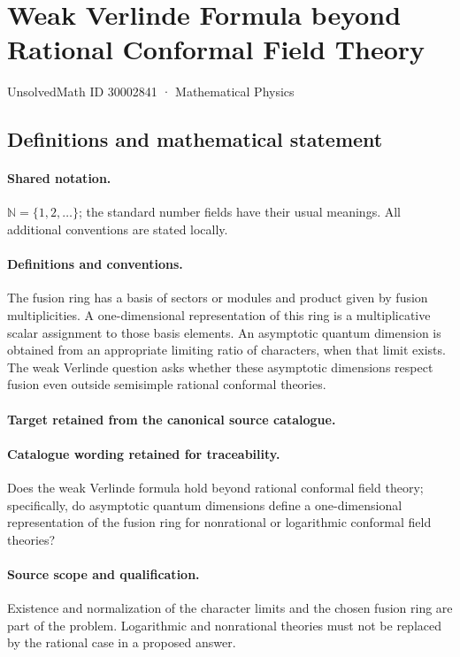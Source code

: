 \documentclass[11pt]{article}
\begin{document}
\setcounter{section}{30002840}
\section{Weak Verlinde Formula beyond Rational Conformal Field Theory}\label{30002841}
{\small UnsolvedMath ID 30002841 · Mathematical Physics}
\subsection{Definitions and mathematical statement}

\paragraph{Shared notation.}$\mathbb N=\{1,2,\ldots\}$; the standard number fields have their usual meanings. All additional conventions are stated locally.


\paragraph{Definitions and conventions.}
The fusion ring has a basis of sectors or modules and product given by fusion multiplicities. A one-dimensional representation of this ring is a multiplicative scalar assignment to those basis elements. An asymptotic quantum dimension is obtained from an appropriate limiting ratio of characters, when that limit exists. The weak Verlinde question asks whether these asymptotic dimensions respect fusion even outside semisimple rational conformal theories.

\paragraph{Target retained from the canonical source catalogue.}
\paragraph{Catalogue wording retained for traceability.}
Does the weak Verlinde formula hold beyond rational conformal field theory; specifically, do asymptotic quantum dimensions define a one-dimensional representation of the fusion ring for nonrational or logarithmic conformal field theories?

\paragraph{Source scope and qualification.}
Existence and normalization of the character limits and the chosen fusion ring are part of the problem. Logarithmic and nonrational theories must not be replaced by the rational case in a proposed answer.
\end{document}
